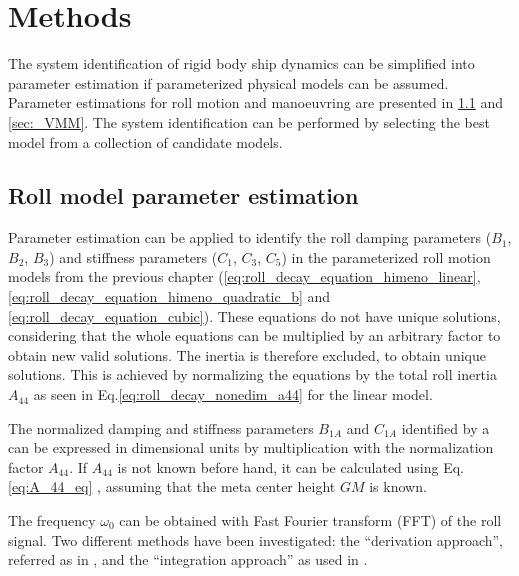 \chapter{Methods\label{ch:methods}}
The system identification of rigid body ship dynamics can be simplified into parameter estimation if parameterized physical models can be assumed. Parameter estimations for roll motion and manoeuvring are presented in \ref{sec:_roll} and \ref{sec:_VMM}. The system identification can be performed by selecting the best model from a collection of candidate models.

\section{Roll model parameter estimation} \label{sec:_roll}
\noindent Parameter estimation can be applied to identify the roll damping parameters ($B_1$, $B_2$, $B_3$) and stiffness parameters ($C_1$, $C_3$, $C_5$) in the parameterized roll motion models from the previous chapter (\autoref{eq:roll_decay_equation_himeno_linear}, \autoref{eq:roll_decay_equation_himeno_quadratic_b} and \autoref{eq:roll_decay_equation_cubic}). These equations do not have unique solutions, considering that the whole equations can be multiplied by an arbitrary factor to obtain new valid solutions. The inertia is therefore excluded, to obtain unique solutions. This is achieved by normalizing the equations by the total roll inertia $A_{44}$ as seen in Eq.\ref{eq:roll_decay_nonedim_a44} for the linear model.



\noindent The normalized damping and stiffness parameters $B_{1A}$ and $C_{1A}$ identified by a  can be expressed in dimensional units by multiplication with the normalization factor $A_{44}$. If $A_{44}$ is not known before hand, it can be calculated using Eq.\ref{eq:A_44_eq} \cite{piehl_ship_2016}, assuming that the meta center height $GM$ is known.


\noindent The frequency $\omega_0$ can be obtained with Fast Fourier transform (FFT) of the roll signal. 
Two different  methods have been investigated: the ``derivation approach'', referred as  in \parencite{imo_1200_2006}, and the ``integration approach'' as used in \cite{soder_assessment_2019}. 

